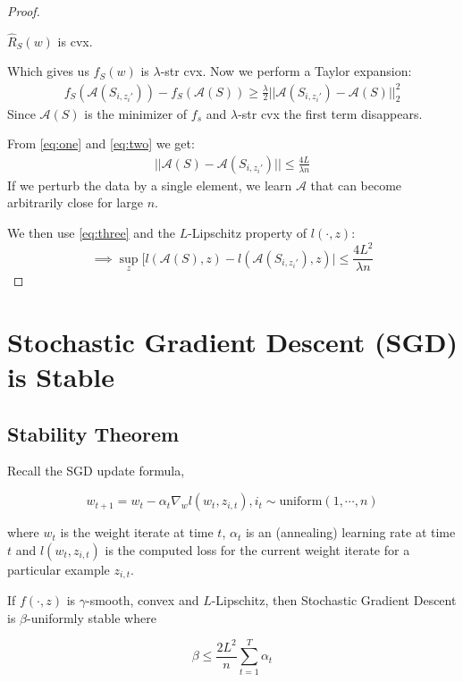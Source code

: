 \documentclass{article}
\begin{document}
\begin{proof}
\begin{assm}
    $\hat{R}_S(w)$  is cvx.
\end{assm}
Which gives us $f_S(w)$ is $\lambda$-str cvx.
Now we perform a Taylor expansion:
\begin{align}
    f_S(\mathcal{A}(S_{i,z_i'})) - f_S(\mathcal{A}(S)) \geq \frac{\lambda}{2}||\mathcal{A}(S_{i,z_i'}) - \mathcal{A}(S)||_2^2
\label{eq:two}
\end{align}
Since $\mathcal{A}(S)$ is the minimizer of $f_s$ and $\lambda$-str cvx the first term disappears.

From \ref{eq:one} and \ref{eq:two} we get:
\begin{align}
    ||\mathcal{A}(S) - \mathcal{A}(S_{i,z_i'})|| \leq \frac{4L}{\lambda n}
\label{eq:three}
\end{align}
If we perturb the data by a single element, we learn $\mathcal{A}$ that can become arbitrarily close for large $n$.

We then use \ref{eq:three} and the $L$-Lipschitz property of $l(\cdot,z)$:
$$\implies \sup_z[l(\mathcal{A}(S), z) - l(\mathcal{A}(S_{i,z_i'}), z)| \leq \frac{4L^2}{\lambda n}$$
\end{proof}


\section*{Stochastic Gradient Descent (SGD) is Stable}

\subsection*{Stability Theorem}
Recall the SGD update formula,

\begin{equation}
    w_{t+1} = w_t - \alpha_t \nabla_w l(w_t, z_{i,t}), i_t   \sim \text{uniform}(1, \cdots, n )
\end{equation}

where $w_t$ is the weight iterate at time $t$, $\alpha_t$ is an (annealing) learning rate at time $t$ and $l(w_t, z_{i,t})$ is the computed loss for the current weight iterate for a particular example $z_{i,t}$.
 

\begin{thm}
If $f(\cdot, z)$ is $\gamma$-smooth, convex and $L$-Lipschitz, then Stochastic Gradient Descent is $\beta$-uniformly stable where

\[
\beta \leq \frac{2L^2}{n} \sum_{t=1}^{T} \alpha_t
\]
\end{thm}
\end{document}
